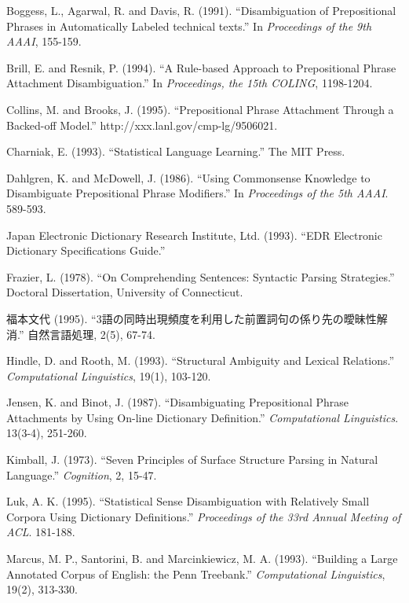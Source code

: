 \begin{thebibliography}{18}
	Boggess, L., Agarwal, R. and Davis,
R. (1991). ``Disambiguation of Prepositional Phrases in Automatically
             Labeled technical texts.'' In {\it Proceedings of the 9th
             AAAI}, 155-159.


        Brill, E. and Resnik, P. (1994). ``A Rule-based Approach to 
	  Prepositional Phrase Attachment Disambiguation.'' In 
	  {\it Proceedings, the 15th COLING}, 1198-1204.


	Collins, M. and Brooks, J. (1995). ``Prepositional Phrase Attachment
	  Through a Backed-off Model.'' http://xxx.lanl.gov/cmp-lg/9506021.


	Charniak, E. (1993). ``Statistical Language Learning.'' The MIT Press.

	Dahlgren, K. and McDowell, J. (1986). ``Using Commonsense Knowledge to 
          Disambiguate Prepositional Phrase Modifiers.'' 
	  In {\it Proceedings of the 5th AAAI}. 589-593.

	Japan Electronic Dictionary Research Institute, Ltd. (1993).  
	  ``EDR Electronic Dictionary Specifications Guide.''

	Frazier, L. (1978). ``On Comprehending Sentences: Syntactic Parsing 
	  Strategies.'' Doctoral Dissertation, University of Connecticut.

	福本文代 (1995). ``3語の同時出現頻度を利用した前置詞句の係り先の曖昧性解消.''
	自然言語処理, 2(5), 67-74. 

	Hindle, D. and Rooth, M. (1993). ``Structural Ambiguity and 
	  Lexical Relations.'' {\it Computational Linguistics}, 19(1), 103-120.

	Jensen, K. and Binot, J. (1987). ``Disambiguating Prepositional Phrase Attachments 
	  by Using On-line Dictionary Definition.'' {\it Computational Linguistics}. 13(3-4),
          251-260. 

	Kimball, J. (1973). ``Seven Principles of Surface Structure Parsing in 
	  Natural Language.'' {\it Cognition}, 2, 15-47.


	Luk, A. K. (1995). ``Statistical Sense Disambiguation with Relatively
	  Small Corpora Using Dictionary Definitions.'' {\it Proceedings of the
	  33rd Annual Meeting of ACL}. 181-188.

	Marcus, M. P., Santorini, B. and Marcinkiewicz, M. A. (1993).
	  ``Building a Large Annotated Corpus of English: the Penn Treebank.'' 
	  {\it Computational Linguistics}, 19(2), 313-330. 


\end{thebibliography}
